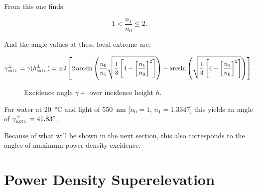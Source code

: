 \documentclass[pagesize=pdftex,paper=a4,fontsize=12pt]{scrartcl}
\begin{document}
From this one finds:

\begin{equation}
	 1 < \frac{n_1}{n_0} \leq 2.
\end{equation}

And the angle values at these local extreme are:

\begin{equation}
	\gamma_{\text{extr.}}^{\pm} = \gamma (h_{\text{extr.}}^{\pm}) = \pm 2 \left[2 \arcsin\left(\frac{n_0}{n_1} \sqrt{\frac{1}{3} \left[4 - \left[\frac{n_1}{n_0}\right]^2\right]}\right) - \arcsin\left(\sqrt{\frac{1}{3} \left[4 - \left[\frac{n_1}{n_0}\right]^2\right]}\right)\right].
\end{equation}


\begin{figure}[H]
	\centering
	\caption{Excidence angle $\gamma{+}$ over incidence height $h$.}
	\label{fig:GammaMaxOverRefractiveIndexRelation}
\end{figure}

For water at \SI{20}{\degreeCelsius} and light of \SI{550}{\nano\meter} [$n_0 = 1$, $n_1 = 1.3347$] this yields an angle of $\gamma_{\text{extr.}}^{+} = \SI{41.83}{\degree}$.


Because of what will be shown in the next section, this also corresponds to the angles of maximum power density excidence.


\section{Power Density Superelevation}
\end{document}
